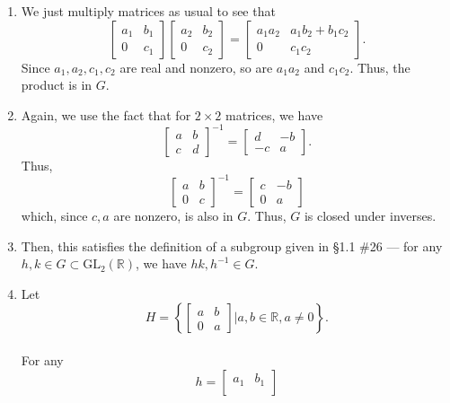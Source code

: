 \documentclass[12 pt, letterpaper]{hmcpset}
\begin{document}
\begin{solution}
	\begin{enumerate}
		\item 
			We just multiply matrices as usual to see that
			\[
				\begin{bmatrix}
					a_1 & b_1 \\
					0 & c_1
				\end{bmatrix}
				\begin{bmatrix}
					a_2 & b_2 \\
					0 & c_2
				\end{bmatrix} = 
				\begin{bmatrix}
					a_1 a_2 & a_1 b_2 + b_1 c_2 \\
					0 & c_1 c_2
				\end{bmatrix}.
			\]
			Since $a_1, a_2, c_1, c_2$ are real and nonzero, so are $a_1 a_2$ and $c_1 c_2$. Thus, the product is in $G$.
		\item
			Again, we use the fact that for $2 \times 2$ matrices, we have
			\[
				\begin{bmatrix}
					a & b \\
					c & d
				\end{bmatrix}^{-1} = 
				\begin{bmatrix}
					d & -b \\
					-c & a
				\end{bmatrix}.
			\]
			Thus,
			\[
				\begin{bmatrix}
					a & b \\
					0 & c
				\end{bmatrix}^{-1} = 
				\begin{bmatrix}
					c & -b \\
					0 & a
				\end{bmatrix}
			\]
			which, since $c, a$ are nonzero, is also in $G$. Thus, $G$ is closed under inverses.
		\item
			Then, this satisfies the definition of a subgroup given in \S 1.1 \#26 --- for any $h, k \in G \subset \mathrm{GL}_2(\mathbb R)$, we have $h k, h^{-1} \in G$.
		\item
			Let
			\[
				H = \left \{ \begin{bmatrix}
				a & b \\
				0 & a
		\end{bmatrix} | a, b \in \mathbb R, a \neq 0 \right \}.
			\] \\
			For any
			\[
				h = \begin{bmatrix}
					a_1 & b_1 \\

\end{bmatrix}\]
\end{enumerate}
\end{solution}
\end{document}
